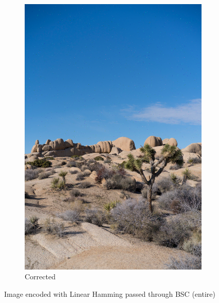 \documentclass{article}
\begin{document}
\begin{figure}
\begin{subfigure}[b]{0.32\textwidth}
        \includegraphics[width=\textwidth]{../Result/linear-bsc-output-syndrome-corrected.png}
        \caption{Corrected}
        \label{fig:image-linear-bsc-syndrome-corrected}
    \end{subfigure}
       \caption{Image encoded with Linear Hamming passed through BSC (entire)}
       \label{fig:image-linear-bsc}
\end{figure}
\end{document}
